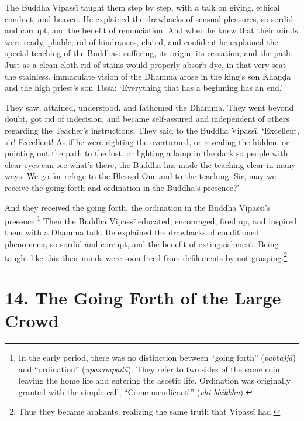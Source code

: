 \documentclass[12pt,openany]{book}%
\begin{document}
The Buddha \textsanskrit{Vipassī} taught them step by step, with a talk on giving, ethical conduct, and heaven. He explained the drawbacks of sensual pleasures, so sordid and corrupt, and the benefit of renunciation. And when he knew that their minds were ready, pliable, rid of hindrances, elated, and confident he explained the special teaching of the Buddhas: suffering, its origin, its cessation, and the path. Just as a clean cloth rid of stains would properly absorb dye, in that very seat the stainless, immaculate vision of the Dhamma arose in the king’s son \textsanskrit{Khaṇḍa} and the high priest’s son Tissa: ‘Everything that has a beginning has an end.’ 

They saw, attained, understood, and fathomed the Dhamma. They went beyond doubt, got rid of indecision, and became self-assured and independent of others regarding the Teacher’s instructions. They said to the Buddha \textsanskrit{Vipassī}, ‘Excellent, sir! Excellent! As if he were righting the overturned, or revealing the hidden, or pointing out the path to the lost, or lighting a lamp in the dark so people with clear eyes can see what’s there, the Buddha has made the teaching clear in many ways. We go for refuge to the Blessed One and to the teaching. Sir, may we receive the going forth and ordination in the Buddha’s presence?’ 

And they received the going forth, the ordination in the Buddha \textsanskrit{Vipassī}’s presence.\footnote{In the early period, there was no distinction between “going forth” (\textit{\textsanskrit{pabbajjā}}) and “ordination” (\textit{\textsanskrit{upasampadā}}). They refer to two sides of the same coin: leaving the home life and entering the ascetic life. Ordination was originally granted with the simple call, “Come mendicant!” (\textit{ehi bhikkhu}). } Then the Buddha \textsanskrit{Vipassī} educated, encouraged, fired up, and inspired them with a Dhamma talk. He explained the drawbacks of conditioned phenomena, so sordid and corrupt, and the benefit of extinguishment. Being taught like this their minds were soon freed from defilements by not grasping.\footnote{Thus they became arahants, realizing the same truth that \textsanskrit{Vipassī} had. } 

\section*{14. The Going Forth of the Large Crowd }
\end{document}
